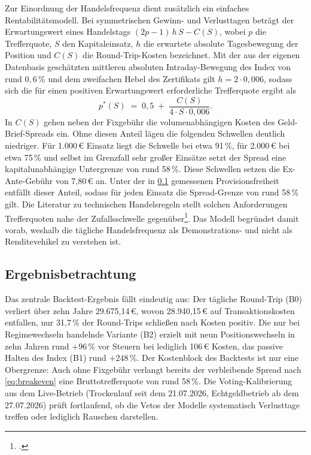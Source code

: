 Zur Einordnung der Handelsfrequenz dient zusätzlich ein einfaches
Rentabilitätsmodell. Bei symmetrischen Gewinn- und Verlusttagen beträgt der
Erwartungswert eines Handelstags $(2p-1)\,h\,S - C(S)$, wobei $p$ die Trefferquote,
$S$ den Kapitaleinsatz, $h$ die erwartete absolute Tagesbewegung der Position und
$C(S)$ die Round-Trip-Kosten bezeichnet. Mit der aus der eigenen Datenbasis
geschätzten mittleren absoluten Intraday-Bewegung des Index von rund $0{,}6\,\%$ und
dem zweifachen Hebel des Zertifikats gilt $h = 2 \cdot 0{,}006$, sodass sich die für
einen positiven Erwartungswert erforderliche Trefferquote ergibt als
\begin{equation}
  p^{*}(S) \;=\; 0{,}5 \;+\; \frac{C(S)}{4 \cdot S \cdot 0{,}006}.
  \label{eq:breakeven}
\end{equation}
In $C(S)$ gehen neben der Fixgebühr die volumenabhängigen Kosten des
Geld-Brief-Spreads ein. Ohne diesen Anteil lägen die folgenden Schwellen deutlich
niedriger. Für 1.000\,€ Einsatz liegt die Schwelle bei etwa 91\,\%, für 2.000\,€ bei
etwa 75\,\% und selbst im Grenzfall sehr großer Einsätze setzt der Spread eine
kapitalunabhängige Untergrenze von rund 58\,\%. Diese Schwellen setzen die Ex-Ante-Gebühr von 7,80\,€ an. Unter der in
\cref{sec:umsetzung-evaluation-ergebnisse} gemessenen Provisionsfreiheit entfällt dieser
Anteil, sodass für jeden Einsatz die Spread-Grenze von rund 58\,\% gilt. Die Literatur zu technischen
Handelsregeln stellt solchen Anforderungen Trefferquoten nahe der Zufallsschwelle
gegenüber\footcites[vgl.][S.~786--826]{park2007}[vgl.][Kap.~1]{zakamulin2017}[vgl.][S.~1705--1765]{lo2000}. Das
Modell begründet damit vorab, weshalb die
tägliche Handelsfrequenz als Demonstrations- und nicht als Renditevehikel zu
verstehen ist.

\subsection{Ergebnisbetrachtung}
\label{sec:umsetzung-evaluation-ergebnisse}

Das zentrale Backtest-Ergebnis fällt eindeutig aus: Der tägliche Round-Trip (B0) verliert
über zehn Jahre 29.675,14\,€, wovon 28.940,15\,€ auf Transaktionskosten entfallen, nur
31,7\,\% der Round-Trips schließen nach Kosten positiv. Die nur bei Regimewechseln handelnde Variante (B2) erzielt mit
neun Positionswechseln in zehn Jahren rund $+96\,\%$ vor Steuern bei lediglich 106\,€
Kosten, das passive Halten des Index (B1) rund $+248\,\%$. Der Kostenblock des Backtests ist nur eine Obergrenze: Auch
ohne Fixgebühr verlangt bereits der verbleibende Spread nach \cref{eq:breakeven} eine
Bruttotrefferquote von rund 58\,\%. Die Voting-Kalibrierung aus dem Live-Betrieb
(Trockenlauf seit dem 21.07.2026, Echtgeldbetrieb ab dem 27.07.2026) prüft fortlaufend, ob
die Vetos der Modelle systematisch Verlusttage treffen oder lediglich Rauschen darstellen.

